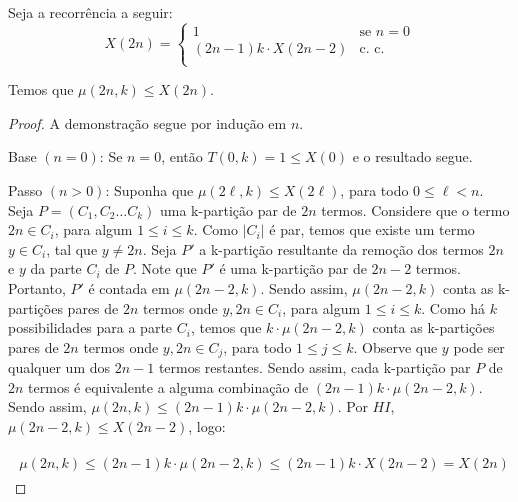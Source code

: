 \documentclass[12pt]{article}
\begin{document}
    
  \begin{lema}  
  	\label{lema9} 
  	Seja a recorrência a seguir: \\
  	
  	\begin{equation}
  		X(2n) =
  		\begin{cases}
  			1 & \text{se $n = 0$}\\
  			(2n - 1) k \cdot X(2n - 2) & \text{c. c.} \\ 
  		\end{cases}
  	\end{equation}
  	
  	Temos que $\mu(2n, k) \leq X(2n)$.
  \end{lema}
  
  \begin{proof} 
  	A demonstração segue por indução em $n$. \newl
  	
  	Base $(n = 0)$: Se $n=0$, então $T(0, k) = 1 \leq X(0)$ e o resultado segue. \newl
  	
  	Passo $(n > 0)$: Suponha que $\mu(2\ell, k) \leq X(2\ell)$, para todo $0 \leq \ell < n$. Seja $P=(C_1, C_2 \ldots C_k)$ uma k-partição par de $2n$ termos. Considere que o termo $2n \in C_i$, para algum $1 \leq i \leq k$. Como $|C_i|$ é par, temos que existe um termo $y \in C_i$, tal que $y \neq 2n$. Seja $P'$ a k-partição resultante da remoção dos termos $2n$ e $y$ da parte $C_i$ de $P$. Note que $P'$ é uma k-partição par de $2n - 2$ termos. Portanto, $P'$ é contada em $\mu(2n - 2, k)$. Sendo assim, $\mu(2n - 2, k)$ conta as k-partições pares de $2n$ termos onde $y, 2n \in C_i$, para algum $1 \leq i \leq k$. Como há $k$ possibilidades para a parte $C_i$, temos que $k \cdot \mu(2n - 2, k)$ conta as k-partições pares de $2n$ termos onde $y, 2n \in C_j$, para todo $1 \leq j \leq k$. Observe que $y$ pode ser qualquer um dos $2n - 1$ termos restantes. Sendo assim, cada k-partição par $P$ de $2n$ termos é equivalente a alguma combinação de $(2n - 1)k \cdot \mu(2n - 2, k)$. Sendo assim, $\mu(2n, k) \leq (2n - 1)k \cdot \mu(2n - 2, k)$. Por $HI$, $\mu(2n - 2, k) \leq X(2n - 2)$, logo:
  	
  	\begin{align}
  		\begin{split}
  			\mu(2n, k) \leq (2n - 1)k \cdot \mu(2n - 2, k) \leq (2n - 1)k \cdot X(2n - 2) = X(2n)
  		\end{split} 
  	\end{align} 
  	
  \end{proof}\newl
  
\end{document}
